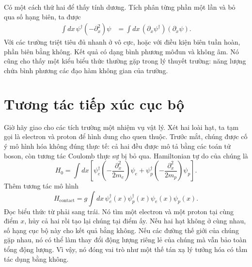 \begin{classroomqa}\end{classroomqa}

Có một cách thứ hai để thấy tính dương. Tích phân từng phần một lần và bỏ qua số hạng biên, ta được
\begin{align}
\int dx\,\psi^\dagger(-\partial_x^2)\psi
&=\int dx\,(\partial_x\psi^\dagger)(\partial_x\psi).
\label{eq:l9-positive-kinetic}
\end{align}
Với các trường triệt tiêu đủ nhanh ở vô cực, hoặc với điều kiện biên tuần hoàn, phần biên bằng không. Kết quả có dạng bình phương môđun và không âm. Nó cũng cho thấy một kiểu biểu thức thường gặp trong lý thuyết trường: năng lượng chứa bình phương các đạo hàm không gian của trường.

\section{Tương tác tiếp xúc cục bộ}

Giờ hãy giao cho các tích trường một nhiệm vụ vật lý. Xét hai loài hạt, ta tạm gọi là electron và proton để hình dung cho quen thuộc. Trước mắt, chúng được cố ý mô hình hóa không đúng thực tế: cả hai đều được mô tả bằng các toán tử boson, còn tương tác Coulomb thực sự bị bỏ qua. Hamiltonian tự do của chúng là
\begin{equation}
H_0=\int dx\left[
\psi_e^\dagger\left(-\frac{\partial_x^2}{2m_e}\right)\psi_e
+
\psi_p^\dagger\left(-\frac{\partial_x^2}{2m_p}\right)\psi_p
\right].
\end{equation}
Thêm tương tác mô hình
\begin{equation}
H_{\mathrm{contact}}
=g\int dx\,
\psi_e^\dagger(x)\psi_p^\dagger(x)
\psi_e(x)\psi_p(x).
\label{eq:l9-contact}
\end{equation}
Đọc biểu thức từ phải sang trái. Nó tìm một electron và một proton tại cùng điểm \(x\), hủy cả hai rồi tạo lại chúng tại điểm ấy. Nếu hai hạt không ở cùng nhau, số hạng cục bộ này cho kết quả bằng không. Nếu các đường thế giới của chúng gặp nhau, nó có thể làm thay đổi động lượng riêng lẻ của chúng mà vẫn bảo toàn tổng động lượng. Vì vậy, nó đóng vai trò như một thế tán xạ lý tưởng hóa có tầm tác dụng bằng không.


